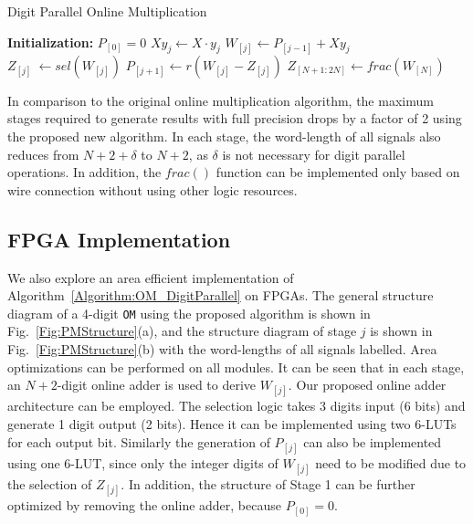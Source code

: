 \documentclass[conference]{IEEEtran}
\begin{document}
\begin{algorithm}[tbp]
  \caption{Digit Parallel Online Multiplication}\label{Algorithm:OM_DigitParallel}
  \begin{algorithmic}[1]
    \State \textbf{Initialization:} $P_{[0]}=0$						\vspace{.5ex}
    										\vspace{.5ex}
    	\State $Xy_j \leftarrow X \cdot y_j$						\vspace{.5ex}
    	\State $W_{[j]}    \leftarrow  P_{[j-1]} + Xy_j$			\vspace{.5ex}
     	\State $Z_{[j]}  ~      \leftarrow  sel(W_{[j]})$			\vspace{.5ex}
	 	\State $P_{[j+1]}  \leftarrow  r\left(W_{[j]}-Z_{[j]}\right)$	\vspace{.5ex}
    \EndFor															\vspace{.5ex}
    \State $Z_{[N+1:2N]} \leftarrow frac(W_{[N]})$
  \end{algorithmic}
\end{algorithm}

In comparison to the original online multiplication algorithm, the maximum stages required to generate results with full precision drops by a factor of 2 using the proposed new algorithm. In each stage, the word-length of all signals also reduces from $N+2+\delta$ to $N+2$, as $\delta$ is not necessary for digit parallel operations. In addition, the $frac()$ function can be implemented only based on wire connection without using other logic resources.

\subsection{FPGA Implementation}
We also explore an area efficient implementation of Algorithm~\ref{Algorithm:OM_DigitParallel} on FPGAs. The general structure diagram of a 4-digit \texttt{OM} using the proposed algorithm is shown in Fig.~\ref{Fig:PMStructure}(a), and the structure diagram of stage $j$ is shown in Fig.~\ref{Fig:PMStructure}(b) with the word-lengths of all signals labelled. Area optimizations can be performed on all modules. It can be seen that in each stage, an $N+2$-digit online adder is used to derive $W_{[j]}$. Our proposed online adder architecture can be employed. The selection logic takes 3 digits input (6 bits) and generate 1 digit output (2 bits). Hence it can be implemented using two 6-LUTs for each output bit. Similarly the generation of $P_{[j]}$ can also be implemented using one 6-LUT, since only the integer digits of $W_{[j]}$ need to be modified due to the selection of $Z_{[j]}$. In addition, the structure of Stage 1 can be further optimized by removing the online adder, because $P_{[0]}=0$.
\end{document}

